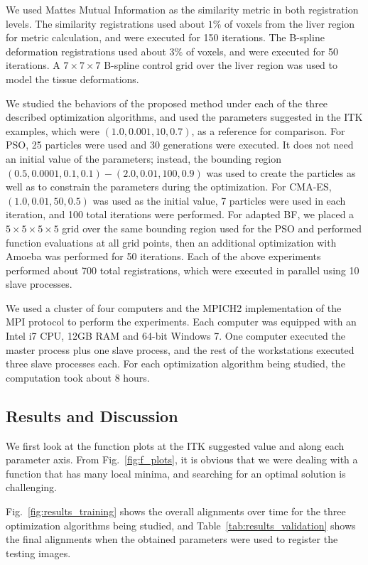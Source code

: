 \documentclass[]{spie}  %
\begin{document}
We used Mattes Mutual Information \cite{Mattes01:SPIE} as the similarity metric in both registration levels. The similarity registrations used about $1\%$ of voxels from the liver region for metric calculation, and were executed for 150 iterations. The B-spline deformation registrations used about $3\%$ of voxels, and were executed for 50 iterations. A $7 \times 7 \times 7$ B-spline control grid over the liver region was used to model the tissue deformations.

We studied the behaviors of the proposed method under each of the three described optimization algorithms, and used the parameters suggested in the ITK examples, which were $(1.0,0.001,10,0.7)$, as a reference for comparison. 
For PSO, 25 particles were used and 30 generations were executed. It does not need an initial value of the parameters; instead, the bounding region $(0.5,0.0001,0.1,0.1)-(2.0,0.01,100,0.9)$ was used to create the particles as well as to constrain the parameters during the optimization. 
For CMA-ES, $(1.0,0.01,50,0.5)$ was used as the initial value, 7 particles were used in each iteration, and 100 total iterations were performed. 
For adapted BF, we placed a $5 \times 5 \times 5 \times 5$ grid over the same bounding region used for the PSO and performed function evaluations at all grid points, then an additional optimization with Amoeba was performed for 50 iterations. Each of the above experiments performed about 700 total registrations, which were executed in  parallel using 10 slave processes.

We used a cluster of four computers and the MPICH2 implementation of the MPI protocol to perform the experiments. Each computer was equipped with an Intel i7 CPU, 12GB RAM and 64-bit Windows 7. One computer executed the master process plus one slave process, and the rest of the workstations executed three slave processes each. For each optimization algorithm being studied, the computation took about 8 hours.

\subsection{Results and Discussion}

We first look at the function plots at the ITK suggested value and along each parameter axis. From Fig.~\ref{fig:f_plots}, it is obvious that we were dealing with a function that has many local minima, and searching for an optimal solution is challenging.

Fig.~\ref{fig:results_training} shows the overall alignments over time for the three optimization algorithms being studied, and Table~\ref{tab:results_validation} shows the final alignments when the obtained parameters were used to register the testing images.
\end{document}
